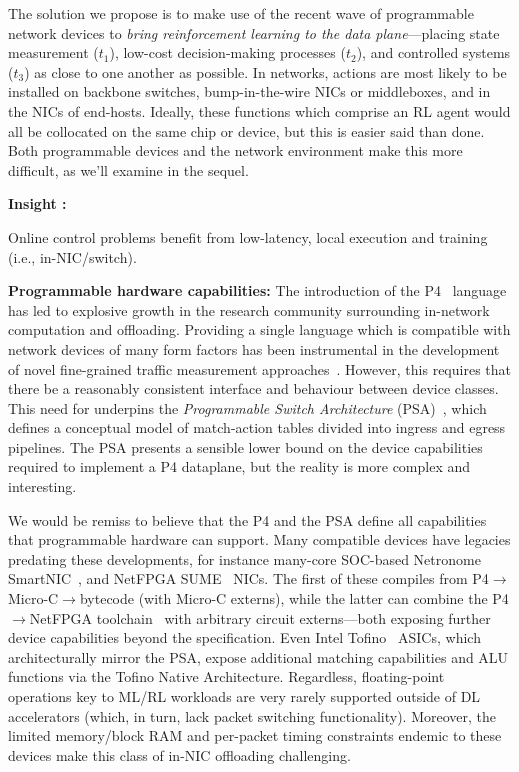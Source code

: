 \documentclass[sigconf,natbib=false]{acmart}
\newcommand{\fakepara}[1]{\noindent\textbf{#1:}}
\newcounter{insightc}
\newenvironment{insight}
	{
		\begin{tipblock}\refstepcounter{insightc}\textbf{Insight \theinsightc:}\em
	}
	{
		\end{tipblock}
	}
\begin{document}
The solution we propose is to make use of the recent wave of programmable network devices to \emph{bring reinforcement learning to the data plane}---placing state measurement ($t_1$), low-cost decision-making processes ($t_2$), and controlled systems ($t_3$) as close to one another as possible.
In networks, actions are most likely to be installed on backbone switches, bump-in-the-wire NICs or middleboxes, and in the NICs of end-hosts.
Ideally, these functions which comprise an RL agent would all be collocated on the same chip or device, but this is easier said than done. 
Both programmable devices and the network environment make this more difficult, as we'll examine in the sequel.

\begin{insight}
	Online control problems benefit from low-latency, local execution and training (i.e., in-NIC/switch).
\end{insight}

\fakepara{Programmable hardware capabilities}
The introduction of the P4~\parencite{DBLP:journals/ccr/BosshartDGIMRSTVVW14} language has led to explosive growth in the research community surrounding in-network computation and offloading.
Providing a single language which is compatible with network devices of many form factors has been instrumental in the development of novel fine-grained traffic measurement approaches~\parencite{DBLP:conf/sigcomm/GuptaHCFRW18,DBLP:conf/sigcomm/ChenFKRR18,DBLP:conf/sosr/GhasemiBR17}.
However, this requires that there be a reasonably consistent interface and behaviour between device classes.
This need for underpins the \emph{Programmable Switch Architecture} (PSA)~\parencite{p4-psa}, which defines a conceptual model of match-action tables divided into ingress and egress pipelines.
The PSA presents a sensible lower bound on the device capabilities required to implement a P4 dataplane, but the reality is more complex and interesting.

We would be remiss to believe that the P4 and the PSA define all capabilities that programmable hardware can support.
Many compatible devices have legacies predating these developments, for instance many-core SOC-based Netronome SmartNIC~\parencite{netronome-smartnic}, and NetFPGA SUME~\parencite{DBLP:journals/micro/ZilbermanACM14} NICs.
The first of these compiles from P4$\rightarrow$Micro-C$\rightarrow$bytecode (with Micro-C externs), while the latter can combine the P4$\rightarrow$NetFPGA toolchain~\parencite{DBLP:conf/fpga/IbanezBMZ19} with arbitrary circuit externs---both exposing further device capabilities beyond the specification.
Even Intel Tofino~\parencite{barefoot-intel} ASICs, which architecturally mirror the PSA, expose additional matching capabilities and ALU functions via the Tofino Native Architecture.
Regardless, floating-point operations key to ML/RL workloads are very rarely supported outside of DL accelerators (which, in turn, lack packet switching functionality).
Moreover, the limited memory/block RAM and per-packet timing constraints endemic to these devices make this class of in-NIC offloading challenging.
\end{document}
